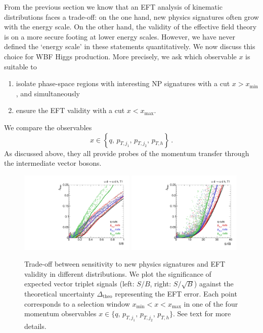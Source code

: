 \newparagraph
%
From the previous section we know that an EFT analysis of kinematic
distributions faces a trade-off: on the one hand, new physics
signatures often grow with the energy scale. On the other hand, the
validity of the effective field theory is on a more secure footing at
lower energy scales. However, we have never defined the `energy scale'
in these statements quantitatively. We now discuss this choice for WBF
Higgs production. More precisely, we ask which observable $x$ is
suitable to
%
\begin{enumerate}
\item isolate phase-space regions with interesting NP signatures with
  a cut $x > x_{\text{min}}$, and simultaneously
\item ensure the EFT validity with a cut $x < x_{\text{max}}$.
\end{enumerate}
%
We compare the observables
%
\begin{equation}
  x \in \left\{  q, \, p_{T,j_1}, \, p_{T,j_2}, \, p_{T,h} \right\} \,.
\end{equation}
%
As discussed above, they all provide probes of the momentum transfer
through the intermediate vector bosons. 

\begin{figure}
  \includegraphics[width=0.49\textwidth,clip=true,trim=0 0.2cm 0 0.2cm]{fig/validity/WBF_cuts_T1_SB.pdf}%
  \includegraphics[width=0.49\textwidth,clip=true,trim=0 0.2cm 0 0.2cm]{fig/validity/WBF_cuts_T1_SsqrtB.pdf}%
  \caption{Trade-off between sensitivity to new physics signatures and
    EFT validity in different distributions. We plot the significance
    of expected vector triplet signals (left: $S/B$, right:
    $S/\sqrt{B}$) against the theoretical uncertainty
    $\Delta_{\text{theo}}$ representing the EFT error. Each point
    corresponds to a selection window
    $x_\text{min} < x < x_\text{max}$ in one of the four momentum
    observables
    $x \in \{ q, \, p_{T,j_1}, \, p_{T,j_2}, \, p_{T,h} \}$. See text
    for more details.}
  \label{fig:validity_cuts}
\end{figure}

